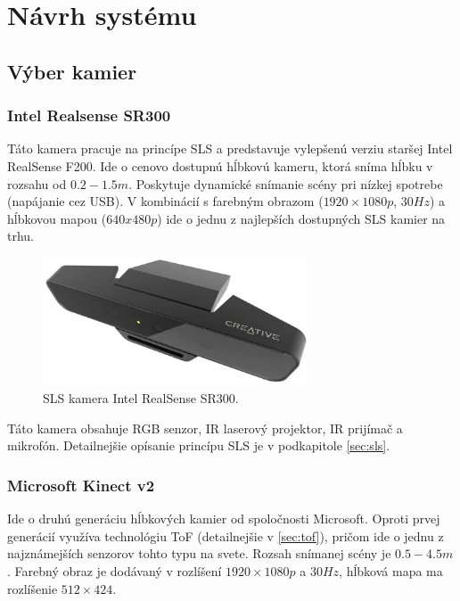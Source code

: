 
\chapter{Návrh systému} 
\label{kap:návrh systému}
\pagestyle{fancy}
\fancyhf{}
\fancyfoot[CE,CO]{\thepage}
\renewcommand{\footrulewidth}{1pt}


\section{Výber kamier}

\subsection{Intel Realsense SR300}

Táto kamera pracuje na princípe SLS a predstavuje vylepšenú verziu staršej Intel RealSense F200. Ide o cenovo dostupnú hĺbkovú kameru, ktorá sníma hĺbku v rozsahu od $0.2-1.5 m$. Poskytuje dynamické snímanie scény pri nízkej spotrebe (napájanie cez USB). V kombinácií s farebným obrazom ($1920\times1080p$, $30Hz$) a hĺbkovou mapou ($640x480p$) ide o jednu z najlepších dostupných SLS kamier na trhu. 

\begin{figure}[H]
	\centering
	\includegraphics[width=0.7\textwidth]{figures/sr300.jpg}
	\caption{SLS kamera Intel RealSense SR300.}
	\label{fig::sr300}
\end{figure}

Táto kamera obsahuje RGB senzor, IR laserový projektor, IR prijímač a mikrofón. Detailnejšie opísanie princípu SLS je v podkapitole \ref{sec:sls}.

\subsection{Microsoft Kinect v2}

Ide o druhú generáciu hĺbkových kamier od spoločnosti Microsoft. Oproti prvej generácií využíva technológiu ToF (detailnejšie v \ref{sec:tof}), pričom ide o jednu z najznámejších senzorov tohto typu na svete. Rozsah snímanej scény je $0.5-4.5 m$. Farebný obraz je dodávaný v rozlíšení $1920\times1080p$ a $30Hz$, hĺbková mapa ma rozlíšenie $512\times424$.

